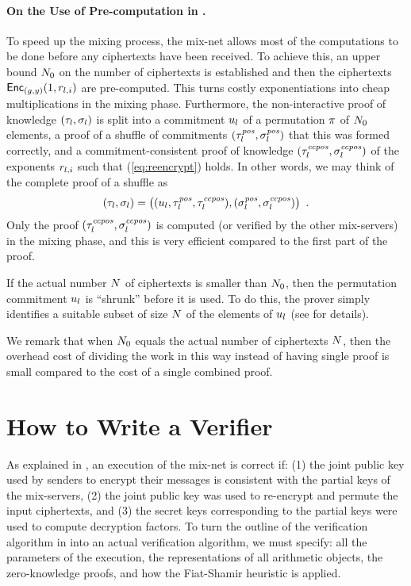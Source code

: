 \documentclass[11pt]{article}
\begin{document}
\paragraph{On the Use of Pre-computation in \veri.}

To speed up the mixing process, the \veri mix-net allows most of the
computations to be done before any ciphertexts have been received. To
achieve this, an upper bound $N_{0}$ on the number of ciphertexts is
established and then the ciphertexts $\textsf{Enc}_{(g,y)}(1,r_{l,i})$
are pre-computed. This turns costly exponentiations into cheap
multiplications in the mixing phase. Furthermore, the non-interactive
proof of knowledge $(\tau_{l},\sigma_{l})$ is split into a
commitment $u_{l}$ of a permutation $\pi$ of $N_{0}$
elements, a proof of a shuffle of commitments
$(\tau_{l}^{\mathit{pos}},\sigma_{l}^{\mathit{pos}})$ that this was formed correctly, and a
commitment-consistent proof of knowledge
$(\tau_{l}^{\mathit{ccpos}},\sigma_{l}^{\mathit{ccpos}})$ of the exponents $r_{l,i}$
such that (\ref{eq:reencrypt}) holds. In other words, we may think of
the complete proof of a shuffle as
\begin{align*}
  (\tau_{l},\sigma_{l})=\big((u_{l},\tau_{l}^{\mathit{pos}},\tau_{l}^{\mathit{ccpos}}),(\sigma_{l}^{\mathit{pos}},\sigma_{l}^{\mathit{ccpos}})\big)\enspace.
\end{align*}
Only the proof $(\tau_{l}^{\mathit{ccpos}},\sigma_{l}^{\mathit{ccpos}})$ is computed (or
verified by the other mix-servers) in the mixing phase, and this is
very efficient compared to the first part of the proof.

If the actual number $N$ of ciphertexts is smaller than $N_{0}$,
then the permutation commitment $u_{l}$ is ``shrunk'' before
it is used. To do this, the prover simply identifies a suitable subset
of size $N$ of the elements of $u_{l}$ (see 
for details).

We remark that when $N_{0}$ equals the actual number of ciphertexts
$N$, then the overhead cost of dividing the work in this way instead
of having single proof is small compared to the cost of a single
combined proof.


\section{How to Write a Verifier}

As explained in , an execution of the mix-net is correct
if: (1) the joint public key used by senders to encrypt their messages
is consistent with the partial keys of the mix-servers, (2) the joint
public key was used to re-encrypt and permute the input ciphertexts,
and (3) the secret keys corresponding to the partial keys were used to
compute decryption factors. To turn the outline of the verification
algorithm in  into an actual verification
algorithm, we must specify: all the parameters of the execution, the
representations of all arithmetic objects, the zero-knowledge proofs,
and how the Fiat-Shamir heuristic is applied.
\end{document}
